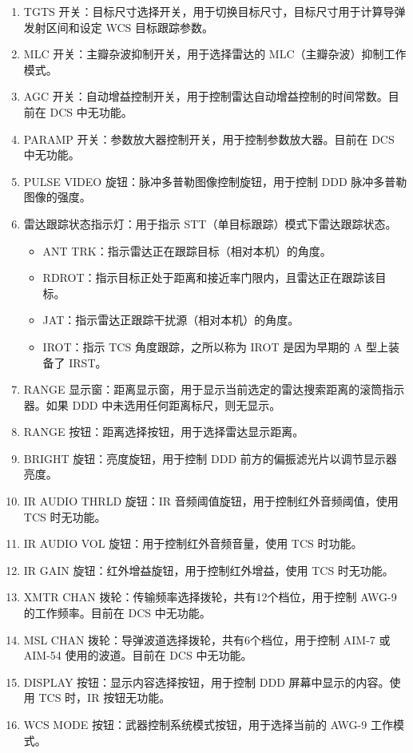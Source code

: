 \begin{enumerate}
  \item TGTS 开关：目标尺寸选择开关，用于切换目标尺寸，目标尺寸用于计算导弹发射区间和设定 WCS 目标跟踪参数。
  \item MLC 开关：主瓣杂波抑制开关，用于选择雷达的 MLC（主瓣杂波）抑制工作模式。
  \item AGC 开关：自动增益控制开关，用于控制雷达自动增益控制的时间常数。目前在 DCS 中无功能。
  \item PARAMP 开关：参数放大器控制开关，用于控制参数放大器。目前在 DCS 中无功能。
  \item PULSE VIDEO 旋钮：脉冲多普勒图像控制旋钮，用于控制 DDD 脉冲多普勒图像的强度。
  \item 雷达跟踪状态指示灯：用于指示 STT（单目标跟踪）模式下雷达跟踪状态。
  \begin{itemize}
    \item ANT TRK：指示雷达正在跟踪目标（相对本机）的角度。
    \item RDROT：指示目标正处于距离和接近率门限内，且雷达正在跟踪该目标。
    \item JAT：指示雷达正跟踪干扰源（相对本机）的角度。
    \item IROT：指示 TCS 角度跟踪，之所以称为 IROT 是因为早期的 A 型上装备了 IRST。
  \end{itemize}
  \item RANGE 显示窗：距离显示窗，用于显示当前选定的雷达搜索距离的滚筒指示器。如果 DDD 中未选用任何距离标尺，则无显示。
  \item RANGE 按钮：距离选择按钮，用于选择雷达显示距离。
  \item BRIGHT 旋钮：亮度旋钮，用于控制 DDD 前方的偏振滤光片以调节显示器亮度。
  \item IR AUDIO THRLD 旋钮：IR 音频阈值旋钮，用于控制红外音频阈值，使用 TCS 时无功能。
  \item IR AUDIO VOL 旋钮：用于控制红外音频音量，使用 TCS 时功能。
  \item IR GAIN 旋钮：红外增益旋钮，用于控制红外增益，使用 TCS 时无功能。
  \item XMTR CHAN 拨轮：传输频率选择拨轮，共有12个档位，用于控制 AWG-9 的工作频率。目前在 DCS 中无功能。
  \item MSL CHAN 拨轮：导弹波道选择拨轮，共有6个档位，用于控制 AIM-7 或 AIM-54 使用的波道。目前在 DCS 中无功能。
  \item DISPLAY 按钮：显示内容选择按钮，用于控制 DDD 屏幕中显示的内容。使用 TCS 时，IR 按钮无功能。
  \item WCS MODE 按钮：武器控制系统模式按钮，用于选择当前的 AWG-9 工作模式。

\end{enumerate}
